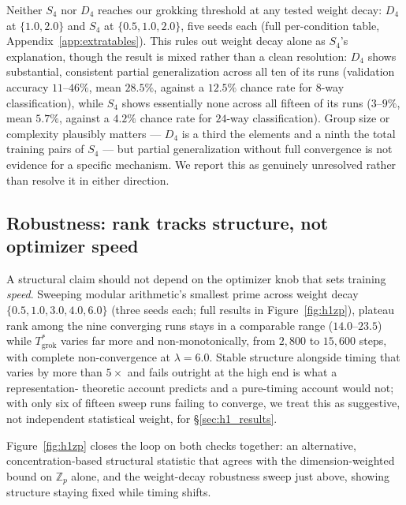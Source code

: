 \documentclass{article}
\begin{document}
Neither $S_4$ nor $D_4$ reaches our grokking threshold at any tested
weight decay: $D_4$ at $\{1.0, 2.0\}$ and $S_4$ at $\{0.5, 1.0, 2.0\}$, five
seeds each (full per-condition table, Appendix~\ref{app:extratables}). This
rules out weight decay alone as $S_4$'s explanation, though the result is
mixed rather than a clean resolution: $D_4$ shows substantial, consistent
partial generalization across all ten of its runs (validation accuracy
$11$--$46\%$, mean $28.5\%$, against a $12.5\%$ chance rate for
$8$-way classification), while $S_4$ shows essentially none across all
fifteen of its runs ($3$--$9\%$, mean $5.7\%$, against a $4.2\%$ chance
rate for $24$-way classification). Group size or complexity plausibly
matters --- $D_4$ is a third the elements and a ninth the total training
pairs of $S_4$ --- but partial generalization without full convergence is
not evidence for a specific mechanism. We report this as genuinely
unresolved rather than resolve it in either direction.

\subsection{Robustness: rank tracks structure, not optimizer speed}
\label{sec:robustness}

A structural claim should not depend on the optimizer knob that sets
training \emph{speed}. Sweeping modular arithmetic's smallest prime across
weight decay $\{0.5,1.0,3.0,4.0,6.0\}$ (three seeds each; full results in
Figure~\ref{fig:h1zp}), plateau rank among
the nine converging runs stays in a comparable range ($14.0$--$23.5$)
while $T^*_{\mathrm{grok}}$ varies far more and non-monotonically, from
$2{,}800$ to $15{,}600$ steps, with complete non-convergence at
$\lambda=6.0$. Stable structure alongside timing that varies by more than
$5\times$ and fails outright at the high end is what a representation-
theoretic account predicts and a pure-timing account would not; with only
six of fifteen sweep runs failing to converge, we treat this as
suggestive, not independent statistical weight, for \S\ref{sec:h1_results}.

Figure~\ref{fig:h1zp} closes the loop on both checks together: an
alternative, concentration-based structural statistic that agrees with
the dimension-weighted bound on $\mathbb{Z}_p$ alone, and the
weight-decay robustness sweep just above, showing structure staying
fixed while timing shifts.
\end{document}
